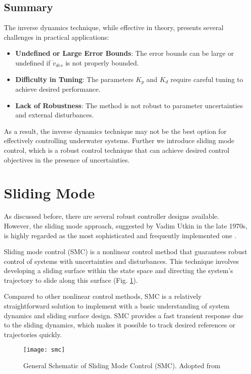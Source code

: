    \subsection{Summary}
    The inverse dynamics technique, while effective in theory, presents several challenges in practical applications:
    \begin{itemize}
        \item \textbf{Undefined or Large Error Bounds}: The error bounds can be large or undefined if $\dot{v}_{des}$ is not properly bounded.
        \item \textbf{Difficulty in Tuning}: The parameters $K_p$ and $K_d$ require careful tuning to achieve desired performance.
        \item \textbf{Lack of Robustness}: The method is not robust to parameter uncertainties and external disturbances.
    \end{itemize}

    As a result, the inverse dynamics technique may not be the best option for effectively 
    controlling underwater systems. Further we introduce sliding mode control, which is a robust 
    control technique that can achieve desired control objectives in the presence of uncertainties.

\section{Sliding Mode}

    As discussed before, there are several robust controller
    designs available. However, the sliding mode approach, suggested by Vadim 
    Utkin in the late 1970s, is highly regarded as the most sophisticated and 
    frequently implemented one \cite{utkin}.

    Sliding mode control (SMC) is a nonlinear control method that guarantees
    robust control of systems with uncertainties and disturbances.
    This technique involves developing a sliding surface within the state
    space and directing the system's trajectory to slide along this surface (Fig. \ref{image:sliding_mode}).
    
    Compared to other nonlinear control methods, SMC is a relatively straightforward
    solution to implement with a basic understanding of system dynamics and sliding
    surface design. SMC provides a fast transient response due to the sliding dynamics, which makes 
    it possible to track desired references or trajectories quickly.

    \begin{figure}[H]
        \centering\texttt{[image: smc]}
        \caption{General Schematic of Sliding Mode Control (SMC). Adopted from \cite{img_smc}}
        \label{image:sliding_mode}
    \end{figure}

